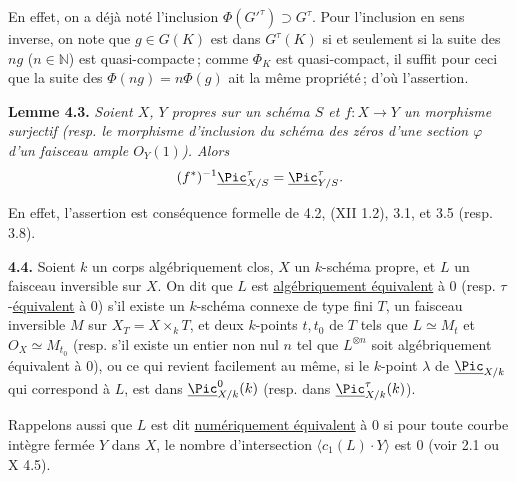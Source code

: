 
En
effet, on a d\'ej\`a not\'e l'inclusion \(\Phi(G'^\tau)\supset G^\tau\). Pour l'inclusion en sens inverse, on note que \(g\in G(K)\) est dans \(G^\tau(K)\) si et seulement si la suite des \(ng\) (\(n\in\mathbb N\)) est quasi-compacte\,; comme \(\Phi_K\) est quasi-compact, il suffit pour ceci que la suite des \(\Phi(ng)=n\Phi(g)\) ait la m\^eme propri\'et\'e\,; d'o\`u l'assertion.

\textbf{Lemme 4.3.} \emph{Soient \(X\), \(Y\) propres sur un sch\'ema \(S\) et \(f:X\to Y\) un morphisme surjectif (resp. le morphisme d'inclusion du sch\'ema des z\'eros d'une section \(\varphi\) d'un faisceau ample \({O}_Y(1)\)). Alors}
\[
  (f^*)^{-1}\underline{\Pic}^\tau_{X/S}=\underline{\Pic}^\tau_{Y/S}.
\]

En effet, l'assertion est cons\'equence formelle de 4.2, (XII 1.2), 3.1, et 3.5 (resp. 3.8).

\textbf{4.4.} Soient \(k\) un corps alg\'ebriquement clos, \(X\) un \(k\)-sch\'ema propre, et \(L\) un faisceau inversible sur \(X\). On dit que \(L\) est \uline{alg\'ebriquement \'equivalent} \`a \(0\) (resp. \(\tau\)-\uline{\'equivalent} \`a \(0\)) s'il existe un \(k\)-sch\'ema connexe de type fini \(T\), un faisceau inversible \(M\) sur \(X_T=X\times_k T\), et deux \(k\)-points \(t,t_0\) de \(T\) tels que \(L\simeq M_t\) et \({O}_X\simeq M_{t_0}\) (resp. s'il existe un entier non nul \(n\) tel que \(L^{\otimes n}\) soit alg\'ebriquement \'equivalent \`a \(0\)), ou ce qui revient facilement au m\^eme, si le \(k\)-point \(\lambda\) de \(\underline{\Pic}_{X/k}\) qui correspond \`a \(L\), est dans \(\underline{\Pic}^0_{X/k}(k)\) (resp. dans \(\underline{\Pic}^\tau_{X/k}(k)\)).

Rappelons aussi que \(L\) est dit \uline{num\'eriquement \'equivalent} \`a \(0\) si pour toute courbe int\`egre ferm\'ee \(Y\) dans \(X\), le nombre d'intersection \(\langle c_1(L)\cdot Y\rangle\) est \(0\) (voir 2.1 ou X 4.5).

